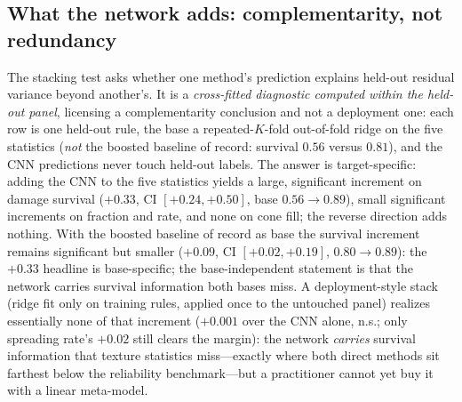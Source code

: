 \documentclass[aip,cha,amsmath,amssymb,reprint,floatfix]{revtex4-2}
\begin{document}
\subsection{What the network adds: complementarity, not redundancy}
\label{sec:stacking}

The stacking test asks whether one method's prediction
explains held-out residual variance beyond another's. It is a
\emph{cross-fitted diagnostic computed within the held-out panel}, licensing
a complementarity conclusion and not a deployment one: each row is one
held-out rule, the base a repeated-$K$-fold out-of-fold ridge on the five
statistics (\emph{not} the boosted baseline of record: survival $0.56$
versus $0.81$), and the CNN predictions never touch held-out labels. The
answer is target-specific: adding the CNN to the five statistics yields a
large, significant increment on damage survival ($+0.33$, CI
$[+0.24,+0.50]$, base $0.56\to0.89$), small significant increments on
fraction and rate, and none on cone fill; the reverse direction adds
nothing. With the boosted baseline of record as base the survival increment
remains significant but smaller ($+0.09$, CI
$[+0.02,+0.19]$, $0.80\to0.89$): the $+0.33$ headline is base-specific; the
base-independent statement is that the network carries survival information
both bases miss. A deployment-style stack (ridge fit only on training rules,
applied once to the untouched panel) realizes essentially none of that
increment ($+0.001$ over the CNN alone, n.s.; only spreading rate's $+0.02$
still clears the margin): the network \emph{carries} survival information
that texture statistics miss---exactly where both direct methods sit farthest
below the reliability benchmark---but a practitioner cannot yet buy it with a
linear meta-model.
\end{document}
